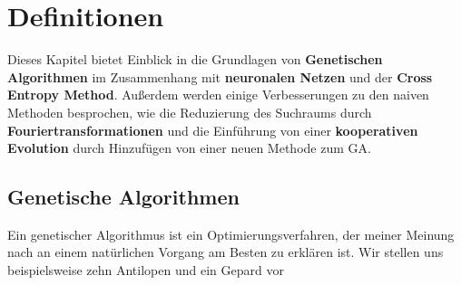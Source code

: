 
\chapter{Definitionen}


Dieses Kapitel bietet Einblick in die Grundlagen von \textbf{Genetischen Algorithmen} im Zusammenhang mit \textbf{neuronalen Netzen} und der \textbf{Cross Entropy Method}. Außerdem werden einige Verbesserungen zu den naiven Methoden besprochen, wie die Reduzierung des Suchraums durch \textbf{Fouriertransformationen} und die Einführung von einer \textbf{kooperativen Evolution} durch Hinzufügen von einer neuen Methode zum GA.

    \section{Genetische Algorithmen}


        Ein genetischer Algorithmus ist ein Optimierungsverfahren, der meiner Meinung nach an einem natürlichen Vorgang am Besten zu erklären ist. Wir stellen uns beispielsweise zehn Antilopen und ein Gepard vor

